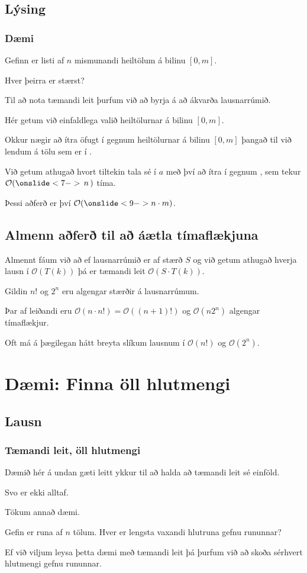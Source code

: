 \subsection{Lýsing}
{
    \frametitle{Dæmi}
    {
        \item<1-> Gefinn er listi  af $n$ mismunandi heiltölum á bilinu $[0, m]$.
        \item<2-> Hver þeirra er stærst?
        \item<3-> Til að nota tæmandi leit þurfum við að byrja á að ákvarða lausnarrúmið.
        \item<4-> Hér getum við einfaldlega valið heiltölurnar á bilinu $[0, m]$.
        \item<5-> Okkur nægir að ítra öfugt í gegnum heiltölurnar á bilinu $[0, m]$ þangað til við lendum á tölu sem er í .
        \item<6-> Við getum athugað hvort tiltekin tala sé í $a$ með því að ítra í gegnum ,
            sem tekur $\mathcal{O}(\onslide<7->{\,n\,})$ tíma.
        \item<8-> Þessi aðferð er því $\mathcal{O}(\onslide<9->{n \cdot m})$.
    }
}

\subsection{Almenn aðferð til að áætla tímaflækjuna}
{
    {
        \item<1-> Almennt fáum við að ef lausnarrúmið er af stærð $S$ og við getum athugað hverja lausn í $\mathcal{O}(T(k))$
            þá er tæmandi leit $\mathcal{O}(S \cdot T(k))$.
        \item<2-> Gildin $n!$ og $2^n$ eru algengar stærðir á lausnarrúmum.
        \item<3-> Þar af leiðandi eru $\mathcal{O}(n \cdot n!) = \mathcal{O}((n + 1)!)$ og $\mathcal{O}(n 2^n)$ algengar tímaflækjur.
        \item<4-> Oft má á þægilegan hátt breyta slíkum lausnum í $\mathcal{O}(n!)$ og $\mathcal{O}(2^n)$.
    }
}

\section{Dæmi: Finna öll hlutmengi}
\subsection{Lausn}
{
    \frametitle{Tæmandi leit, öll hlutmengi}
    {
        \item<1-> Dæmið hér á undan gæti leitt ykkur til að halda að tæmandi leit sé einföld.
        \item<2-> Svo er ekki alltaf.
        \item<3-> Tökum annað dæmi.
        \item<4-> Gefin er runa af $n$ tölum. Hver er lengsta vaxandi hlutruna gefnu rununnar?
        \item<5-> Ef við viljum leysa þetta dæmi með tæmandi leit þá þurfum við að skoða sérhvert hlutmengi gefnu rununnar.
    }
}

